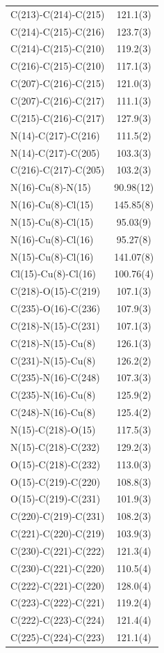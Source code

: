 \begin{center}
{\begin{supertabular}{p{1.5in}c}
C(213)-C(214)-C(215)&121.1(3)\\
C(214)-C(215)-C(216)&123.7(3)\\
C(214)-C(215)-C(210)&119.2(3)\\
C(216)-C(215)-C(210)&117.1(3)\\
C(207)-C(216)-C(215)&121.0(3)\\
C(207)-C(216)-C(217)&111.1(3)\\
C(215)-C(216)-C(217)&127.9(3)\\
N(14)-C(217)-C(216)&111.5(2)\\
N(14)-C(217)-C(205)&103.3(3)\\
C(216)-C(217)-C(205)&103.2(3)\\
N(16)-Cu(8)-N(15)&90.98(12)\\
N(16)-Cu(8)-Cl(15)&145.85(8)\\
N(15)-Cu(8)-Cl(15)&95.03(9)\\
N(16)-Cu(8)-Cl(16)&95.27(8)\\
N(15)-Cu(8)-Cl(16)&141.07(8)\\
Cl(15)-Cu(8)-Cl(16)&100.76(4)\\
C(218)-O(15)-C(219)&107.1(3)\\
C(235)-O(16)-C(236)&107.9(3)\\
C(218)-N(15)-C(231)&107.1(3)\\
C(218)-N(15)-Cu(8)&126.1(3)\\
C(231)-N(15)-Cu(8)&126.2(2)\\
C(235)-N(16)-C(248)&107.3(3)\\
C(235)-N(16)-Cu(8)&125.9(2)\\
C(248)-N(16)-Cu(8)&125.4(2)\\
N(15)-C(218)-O(15)&117.5(3)\\
N(15)-C(218)-C(232)&129.2(3)\\
O(15)-C(218)-C(232)&113.0(3)\\
O(15)-C(219)-C(220)&108.8(3)\\
O(15)-C(219)-C(231)&101.9(3)\\
C(220)-C(219)-C(231)&108.2(3)\\
C(221)-C(220)-C(219)&103.9(3)\\
C(230)-C(221)-C(222)&121.3(4)\\
C(230)-C(221)-C(220)&110.5(4)\\
C(222)-C(221)-C(220)&128.0(4)\\
C(223)-C(222)-C(221)&119.2(4)\\
C(222)-C(223)-C(224)&121.4(4)\\
C(225)-C(224)-C(223)&121.1(4)\\

\end{supertabular}}
\end{center}
